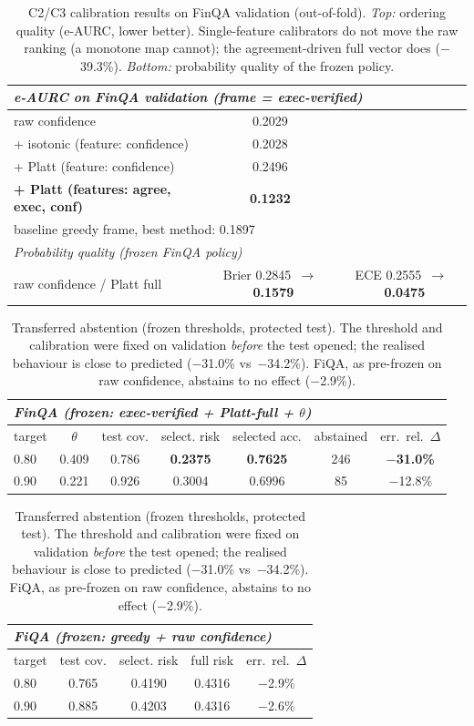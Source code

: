 \documentclass[10pt]{article}
\begin{document}
\begin{table}[t]
\centering
\caption{\label{tab:calib} C2/C3 calibration results on FinQA validation (out-of-fold).
\emph{Top:} ordering quality (e-AURC, lower better). Single-feature calibrators do not move
the raw ranking (a monotone map cannot); the agreement-driven full vector does ($-$39.3\%).
\emph{Bottom:} probability quality of the frozen policy.}
\small
\begin{tabular}{lcc}
\toprule
\multicolumn{3}{l}{\emph{e-AURC on FinQA validation (frame = exec-verified)}}\\
\midrule
raw confidence & 0.2029\\
+ isotonic (feature: confidence) & 0.2028\\
+ Platt (feature: confidence) & 0.2496\\
\rowcolor{gray!15} \textbf{+ Platt (features: agree, exec, conf)} & \textbf{0.1232}\\
\multicolumn{3}{l}{\quad baseline greedy frame, best method: 0.1897}\\
\midrule
\multicolumn{3}{l}{\emph{Probability quality (frozen FinQA policy)}}\\
\midrule
raw confidence / Platt full & Brier 0.2845~$\rightarrow$~\textbf{0.1579} & ECE 0.2555~$\rightarrow$~\textbf{0.0475}\\
\bottomrule
\end{tabular}
\end{table}

\begin{table}[t]
\centering
\caption{\label{tab:transfer} Transferred abstention (frozen thresholds, protected test).
The threshold and calibration were fixed on validation \emph{before} the test opened; the
realised behaviour is close to predicted ($-$31.0\% vs\ $-$34.2\%). FiQA, as pre-frozen on
raw confidence, abstains to no effect ($-$2.9\%).}
\small
\begin{tabular}{lcccccc}
\toprule
\multicolumn{7}{l}{\emph{FinQA (frozen: exec-verified + Platt-full + $\theta$)}}\\
\toprule
target & $\theta$ & test cov. & select. risk & selected acc. & abstained & err.\ rel.\ $\Delta$\\
\midrule
0.80 & 0.409 & 0.786 & \textbf{0.2375} & \textbf{0.7625} & 246 & \textbf{$-$31.0\%}\\
0.90 & 0.221 & 0.926 & 0.3004 & 0.6996 & 85 & $-$12.8\%\\
\bottomrule
\end{tabular}
\vspace{0.4em}
\begin{tabular}{lcccc}
\toprule
\multicolumn{5}{l}{\emph{FiQA (frozen: greedy + raw confidence)}}\\
\toprule
target & test cov. & select. risk & full risk & err.\ rel.\ $\Delta$\\
\midrule
0.80 & 0.765 & 0.4190 & 0.4316 & $-$2.9\%\\
0.90 & 0.885 & 0.4203 & 0.4316 & $-$2.6\%\\
\bottomrule
\end{tabular}
\end{table}
\end{document}
